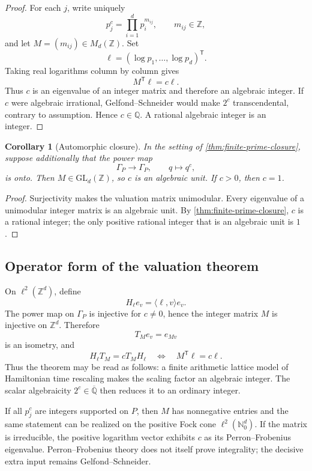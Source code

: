 \documentclass[11pt,oneside]{article}
\newtheorem{corollary}[theorem]{Corollary}
\theoremstyle{definition}
\theoremstyle{remark}
\newcommand{\Nzero}{\mathbb N_0}
\newcommand{\Z}{\mathbb Z}
\newcommand{\Q}{\mathbb Q}
\newcommand{\Alg}{\overline{\mathbb Q}}
\begin{document}
\begin{proof}
For each \(j\), write uniquely
\[
        p_j^c=\prod_{i=1}^d p_i^{m_{ij}},
        \qquad m_{ij}\in\Z,
\]
and let \(M=(m_{ij})\in M_d(\Z)\).  Set
\[
        \ell=(\log p_1,\ldots,\log p_d)^{\mathsf T}.
\]
Taking real logarithms column by column gives
\[
        M^{\mathsf T}\ell=c\ell.
\]
Thus \(c\) is an eigenvalue of an integer matrix and therefore an
algebraic integer.  If \(c\) were algebraic irrational,
Gelfond--Schneider would make \(2^c\) transcendental, contrary to
assumption.  Hence \(c\in\Q\).  A rational algebraic integer is an
integer.
\end{proof}

\begin{corollary}[Automorphic closure]\label{cor:automorphic-closure}
In the setting of \cref{thm:finite-prime-closure}, suppose additionally
that the power map
\[
        \Gamma_P\longrightarrow\Gamma_P,\qquad q\longmapsto q^c,
\]
is onto.  Then \(M\in\mathrm{GL}_d(\Z)\), so \(c\) is an algebraic unit.
If \(c>0\), then \(c=1\).
\end{corollary}

\begin{proof}
Surjectivity makes the valuation matrix unimodular.  Every eigenvalue of
a unimodular integer matrix is an algebraic unit.  By
\cref{thm:finite-prime-closure}, \(c\) is a rational integer; the only
positive rational integer that is an algebraic unit is \(1\).
\end{proof}

\subsection{Operator form of the valuation theorem}

On \(\ell^2(\Z^d)\), define
\[
        H_\ell e_v=\langle\ell,v\rangle e_v.
\]
The power map on \(\Gamma_P\) is injective for \(c\neq0\), hence the
integer matrix \(M\) is injective on \(\Z^d\).  Therefore
\[
        T_Me_v=e_{Mv}
\]
is an isometry, and
\[
        H_\ell T_M=cT_MH_\ell
        \quad\Longleftrightarrow\quad
        M^{\mathsf T}\ell=c\ell.
\]
Thus the theorem may be read as follows: a finite arithmetic lattice
model of Hamiltonian time rescaling makes the scaling factor an
algebraic integer.  The scalar algebraicity \(2^c\in\Alg\) then reduces
it to an ordinary integer.

If all \(p_j^c\) are integers supported on \(P\), then \(M\) has
nonnegative entries and the same statement can be realized on the
positive Fock cone \(\ell^2(\Nzero^d)\).  If the matrix is irreducible,
the positive logarithm vector exhibits \(c\) as its Perron--Frobenius
eigenvalue.  Perron--Frobenius theory does not itself prove integrality;
the decisive extra input remains Gelfond--Schneider.
\end{document}
